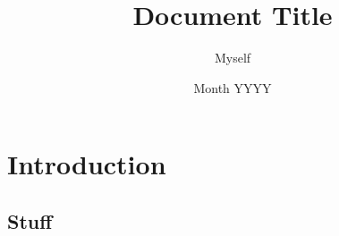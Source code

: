 \documentclass[a4paper, 12pt]{article}
\title{Document Title}
\author{Myself}
\date{Month YYYY}
\begin{document}
	
\maketitle
\hrulefill
\tableofcontents
\newpage
{}

\section{Introduction}
\lipsum[1]\cite{lunduke_half_2018}

\subsection{Stuff}
\lipsum[1]

\printbibliography
\end{document}
